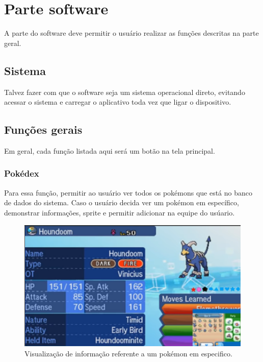 \documentclass[../main.tex]{subfiles}
\begin{document}
\section{Parte software}

A parte do software deve permitir o usuário realizar as funções descritas na parte geral.

\subsection{Sistema}
Talvez fazer com que o software seja um sistema operacional direto, evitando acessar o sistema e carregar o aplicativo toda vez que ligar o dispositivo. \newline

\subsection{Funções gerais}
Em geral, cada função listada aqui será um botão na tela principal. \newline

\subsubsection{Pokédex}
Para essa função, permitir ao usuário ver todos os pokémons que está no banco de dados do sistema. Caso o usuário decida ver um pokémon em específico, demonstrar informações, sprite e permitir adicionar na equipe do usúario.\newline

\begin{figure}[H]
\centering
\includegraphics[scale=0.5]{../Images/softwarePokedexInfo.png}
\caption{Visualização de informação referente a um pokémon em especifico.}
\end{figure}
\end{document}

